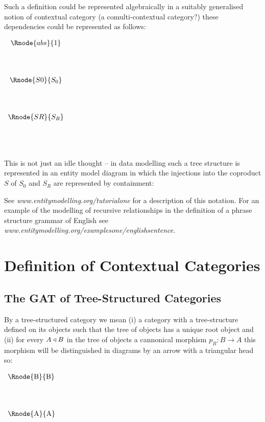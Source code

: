 \documentclass[10pt,a4paper]{scrartcl}
\begin{document}
Such a definition could be represented algebraically in a suitably generalised notion of contextual category (a comulti-contextual category?) these dependencies could be represented
as follows:  

\begin{center}
$
\begin{array}{c c}
\Rnode{abs}{1}  \\ [1.4cm]
\Rnode{S0}{S_0} \\ [1.4cm]
\Rnode{SR}{S_R} \\ [1.4cm]
\end{array}
$
\end{center}

\noindent This is not just an idle thought -- in  data modelling such a tree 
structure is represented in an entity model diagram in which the injections into the coproduct $S$ of $S_0$ and $S_R$ are represented by containment: \\

\begin{center}

\end {center}
See \textit{www.entitymodelling.org/tutorialone} for a description of this notation.
For an example of the modelling of recursive relationships in the definition of a phrase structure grammar of English see 
\textit{www.entitymodelling.org/examplesone/englishsentence}.

\section{Definition of Contextual Categories}
\subsection {The GAT of Tree-Structured Categories}

By a tree-structured category we mean (i) a category with a tree-structure defined on its objects such that the tree of objects has a unique root object and (ii) for every $A \triangleleft B$ in the tree of objects  a cannonical morphism $p_B:B \rightarrow A$ this morphism will be distinguished in diagrams by an arrow with  
a triangular head so:

\begin{center}
$
\begin{array}{p{2cm}p{0.5cm}p{0.5cm}p{0.5cm}}
\Rnode{B}{B}& \\ [1.4cm]
\Rnode{A}{A} \\
\end{array}
$

\end{center}
\end{document}
